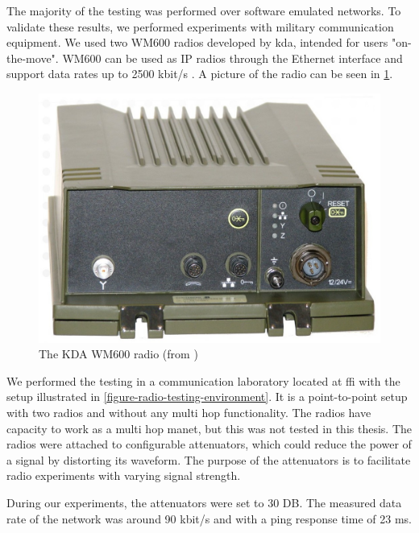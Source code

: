 The majority of the testing was performed over software emulated networks. To
validate these results, we performed experiments with military communication
equipment. We used two WM600 radios developed by \gls{kda}, intended for users
"on-the-move". WM600 can be used as IP radios through the Ethernet interface and
support data rates up to 2500 kbit/s \cite{kongsberg-wm600}. A picture of the
radio can be seen in \cref{figure-kdawm600}.

\begin{figure}[h]
\centering
\includegraphics[scale=0.2]{images/kda_wm600.jpg}
\caption{The KDA WM600 radio (from \cite{kongsberg-wm600})}
\label{figure-kdawm600}
\end{figure}

We performed the testing in a communication laboratory located at \gls{ffi} with
the setup illustrated in \cref{figure-radio-testing-environment}. It is a
point-to-point setup with two radios and without any multi hop functionality.
The radios have capacity to work as a multi hop \gls{manet}, but this was not
tested in this thesis. The radios were attached to configurable attenuators,
which could reduce the power of a signal by distorting its waveform. The purpose
of the attenuators is to facilitate radio experiments with varying signal
strength.

During our experiments, the attenuators were set to 30 DB. The measured data
rate of the network was around 90 kbit/s and with a ping response time of 23 ms.

